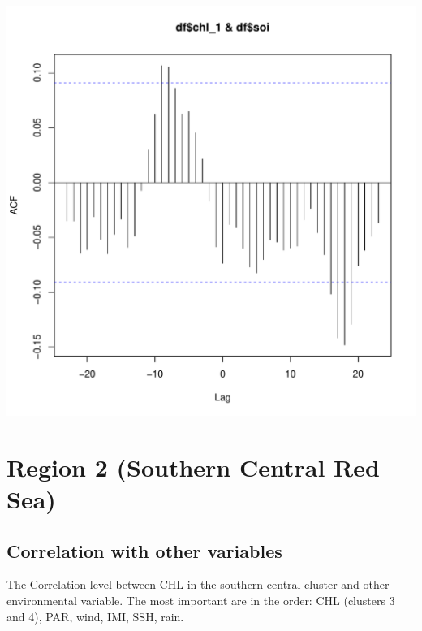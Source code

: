 \documentclass{article}\usepackage[]{graphicx}\usepackage[]{color}
\makeatletter
\def\maxwidth{ %
  \ifdim\Gin@nat@width>\linewidth
    \linewidth
  \else
    \Gin@nat@width
  \fi
}
\newenvironment{knitrout}{}{} %
\makeatother
\begin{document}
\begin{knitrout}
\includegraphics[width=\maxwidth]{figure/unnamed-chunk-33-2} 

\end{knitrout}

\section{Region 2 (Southern Central Red Sea)}

\subsection{Correlation with other variables}

The Correlation level between CHL in the southern central cluster
and other environmental variable.
The most important are in the order: CHL (clusters 3 and 4), PAR, wind, 
IMI, SSH, rain.
\end{document}
